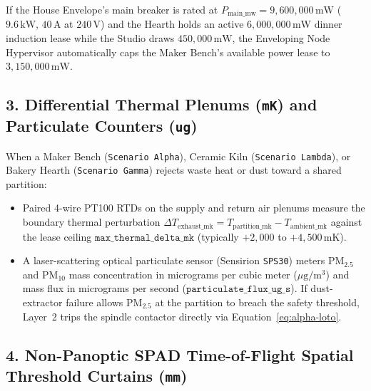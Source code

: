 If the House Envelope's main breaker is rated at $P_{\mathrm{main\_mw}} = 9{,}600{,}000\,\mathrm{mW}$ ($9.6\,\mathrm{kW}$, $40\,\mathrm{A}$ at $240\,\mathrm{V}$) and the Hearth holds an active $6{,}000{,}000\,\mathrm{mW}$ dinner induction lease while the Studio draws $450{,}000\,\mathrm{mW}$, the Enveloping Node Hypervisor automatically caps the Maker Bench's available power lease to $3{,}150{,}000\,\mathrm{mW}$.

\subsection{3. Differential Thermal Plenums (\texttt{mK}) and Particulate Counters (\texttt{ug})}

When a Maker Bench (\texttt{Scenario Alpha}), Ceramic Kiln (\texttt{Scenario Lambda}), or Bakery Hearth (\texttt{Scenario Gamma}) rejects waste heat or dust toward a shared partition:
\begin{itemize}
    \item Paired 4-wire PT100 RTDs on the supply and return air plenums measure the boundary thermal perturbation $\Delta T_{\mathrm{exhaust\_mk}} = T_{\mathrm{partition\_mk}} - T_{\mathrm{ambient\_mk}}$ against the lease ceiling $\mathtt{max\_thermal\_delta\_mk}$ (typically $+2{,}000$ to $+4{,}500\,\mathrm{mK}$).
    \item A laser-scattering optical particulate sensor (Sensirion \texttt{SPS30}) meters $\mathrm{PM}_{2.5}$ and $\mathrm{PM}_{10}$ mass concentration in micrograms per cubic meter ($\mu\mathrm{g/m^3}$) and mass flux in micrograms per second ($\mathtt{particulate\_flux\_ug\_s}$). If dust-extractor failure allows $\mathrm{PM}_{2.5}$ at the partition to breach the safety threshold, Layer~2 trips the spindle contactor directly via Equation~\eqref{eq:alpha-loto}.
\end{itemize}

\subsection{4. Non-Panoptic SPAD Time-of-Flight Spatial Threshold Curtains (\texttt{mm})}

